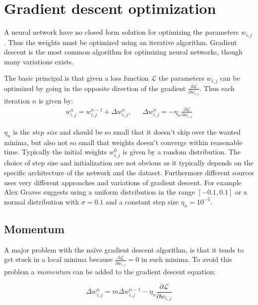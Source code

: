 \section{Gradient descent optimization}

A neural network have no closed form solution for optimizing the parameters $w_{i,j}$. Thus the weights must be optimized using an iterative algorithm. Gradient descent is the most common algorithm for optimizing neural networks, though many variations exists.

The basic principal is that given a loss function $\mathcal{L}$ the parameters $w_{i,j}$ can be optimized by going in the opposite direction of the gradient $\frac{\partial \mathcal{L}}{\partial w_{i,j}}$. Thus each iteration $n$ is given by:
\begin{equation}
\begin{aligned}
w_{i,j}^n = w_{i,j}^{n-1} + \Delta w_{i,j}^n, && \Delta w_{i,j}^n = - \eta_n \frac{\partial \mathcal{L}}{\partial w_{i,j}}
\end{aligned}
\end{equation}

$\eta_n$ is the \textit{step size} and should be so small that it doesn't skip over the wanted minima, but also not so small that weights doesn't converge within reasonable time. Typically the initial weights $w^0_{i,j}$ is given by a random distribution. The choice of step size and initialization are not obvious as it typically depends on the specific architecture of the network and the dataset. Furthermore different sources uses very different approaches and variations of gradient descent. For example Alex Graves \cite{alexgraves} suggests using a uniform distribution in the range $[-0.1, 0.1]$ or a normal distribution with $\sigma = 0.1$ and a constant step size $\eta_n = 10^{-5}$.

\subsection{Momentum}

A major problem with the naïve gradient descent algorithm, is that it tends to get stuck in a local minima because $\frac{\partial \mathcal{L}}{\partial w_{i,j}} = 0$ in such minima. To avoid this problem a \textit{momentum} can be added to the gradient descent equation:

\begin{equation}
\Delta w_{i,j}^n = m \Delta w_{i,j}^{n-1} - \eta_n \frac{\partial \mathcal{L}}{\partial w_{i,j}}
\end{equation}

